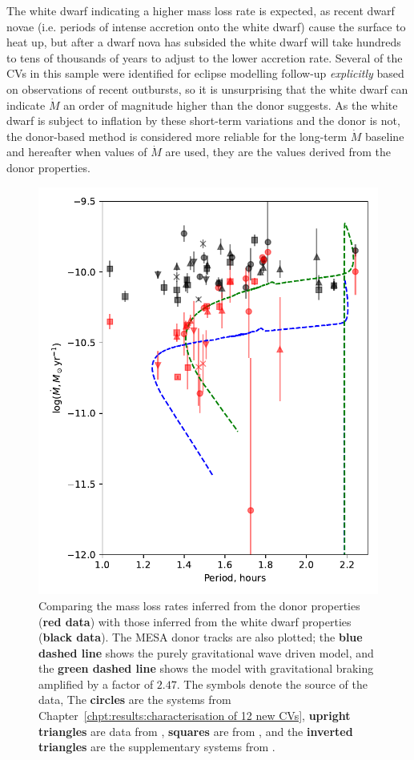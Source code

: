 The white dwarf indicating a higher mass loss rate is expected, as recent dwarf novae (i.e. periods of intense accretion onto the white dwarf) cause the surface to heat up, but after a dwarf nova has subsided the white dwarf will take hundreds to tens of thousands of years to adjust to the lower accretion rate.
Several of the CVs in this sample were identified for eclipse modelling follow-up \textit{explicitly} based on observations of recent outbursts, so it is unsurprising that the white dwarf can indicate $\dot M$ an order of magnitude higher than the donor suggests.
As the white dwarf is subject to inflation by these short-term variations and the donor is not, the donor-based method is considered more reliable for the long-term $\dot M$ baseline and hereafter when values of $\dot M$ are used, they are the values derived from the donor properties.
\begin{figure}
    \centering
    \includegraphics[width=\textwidth]{figures/results/Mdot/compare_mdot_from_donor_vs_wd_vs_period.pdf}
    \caption{Comparing the mass loss rates inferred from the donor properties ({\bf red data}) with those inferred from the white dwarf properties ({\bf black data}). The MESA donor tracks are also plotted; the {\bf blue dashed line} shows the purely gravitational wave driven model, and the {\bf green dashed line} shows the model with gravitational braking amplified by a factor of $2.47$. The symbols denote the source of the data, The {\bf circles} are the systems from Chapter~\ref{chpt:results:characterisation of 12 new CVs}, {\bf upright triangles} are data from \citet{McAllister2019}, {\bf squares} are from \citet{Savoury2011}, and the {\bf inverted triangles} are the supplementary systems from \citet{copperwheat2010,mcallister2015,mcallister2017,mcallister2017b}.}

\end{figure}
